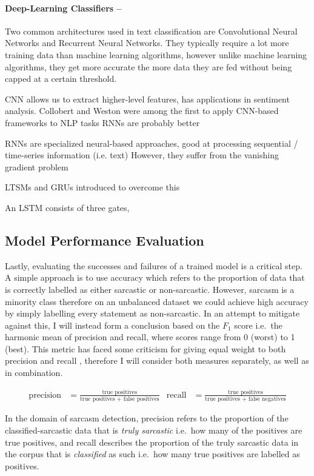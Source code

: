 \documentclass[12pt,a4paper]{article}
\begin{document}
\paragraph{Deep-Learning Classifiers --}
Two common architectures used in text classification are Convolutional Neural Networks and Recurrent Neural Networks. They typically require a lot more training data than machine learning algorithms, however unlike machine learning algorithms, they get more accurate the more data they are fed without being capped at a certain threshold.

CNN allows us to extract higher-level features, has applications in sentiment analysis. Collobert and Weston were among the first to apply CNN-based frameworks to NLP tasks
RNNs are probably better

RNNs are specialized neural-based approaches, good at processing sequential / time-series information (i.e. text)
However, they suffer from the vanishing gradient problem

LTSMs and GRUs introduced to overcome this

An LSTM consists of three gates, 




\newpage


\subsection{Model Performance Evaluation}
\noindent Lastly, evaluating the successes and failures of a trained model is a critical step. A simple approach is to use accuracy which refers to the proportion of data that is correctly labelled as either sarcastic or non-sarcastic. However, sarcasm is a minority class therefore on an unbalanced dataset we could achieve high accuracy by simply labelling every statement as non-sarcastic. In an attempt to mitigate against this, I will instead form a conclusion based on the $F_{1}$ score i.e.\ the harmonic mean of precision and recall, where scores range from 0 (worst) to 1 (best). This metric has faced some criticism for giving equal weight to both precision and recall \cite{hand2018note}, therefore I will consider both measures separately, as well as in combination.

\begin{align*}
\mbox{precision} &= \frac{\mbox{true positives}}{\mbox{true positives + false positives}}   &  \mbox{recall} &= \frac{\mbox{true positives}}{\mbox{true positives + false negatives}}
\end{align*}

\noindent In the domain of sarcasm detection, precision refers to the proportion of the classified-sarcastic data that is \textit{truly sarcastic} i.e.\ how many of the positives are true positives, and recall describes the proportion of the truly sarcastic data in the corpus that is \textit{classified} as such i.e.\ how many true positives are labelled as positives. \\


\hrulefill


\end{document}
